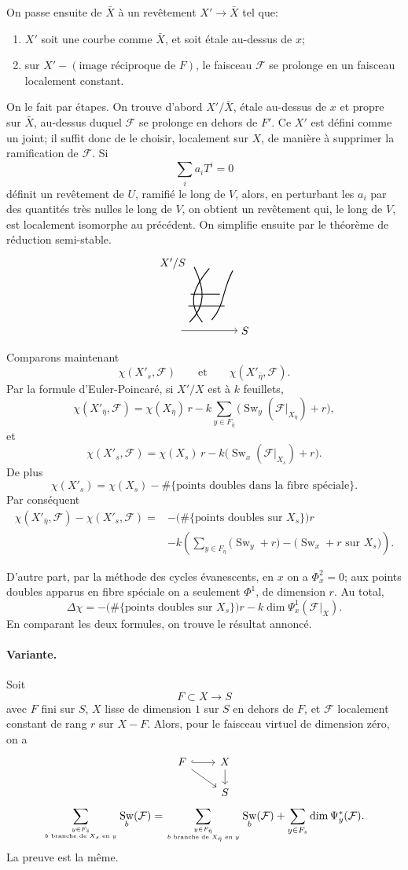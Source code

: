 \documentclass[11pt]{article}
\newcommand{\semistableCoverSketch}{%
\begin{tikzpicture}[scale=.75,baseline=-.5ex]
  \draw[->] (-.2,0) -- (2.2,0) node[right]{$S$};
  \draw[thick] (.15,.35) .. controls (.85,1.05) and (.82,1.75) .. (.35,2.7);
  \draw[thick] (.7,.35) .. controls (.15,1.05) and (.15,1.65) .. (1.0,2.65);
  \draw[thick] (1.1,.45) .. controls (1.65,1.05) and (1.55,1.75) .. (2.0,2.55);
  \draw[thick] (.1,1.05) -- (1.65,1.05);
  \draw[thick] (.2,1.55) -- (1.45,1.55);
  \node[left] at (.15,2.85){$X'/S$};
\end{tikzpicture}%
}
\newcommand{\F}{\mathcal F}
\DeclareMathOperator{\Sw}{Sw}
\begin{document}
On passe ensuite de \(\bar X\) à un revêtement \(X'\to\bar X\) tel que:
\begin{enumerate}[label=\alph*)]
\item \(X'\) soit une courbe comme \(\bar X\), et soit étale au-dessus de \(x\);
\item sur \(X'-(\text{image réciproque de }F)\), le faisceau \(\F\) se prolonge en un faisceau localement constant.
\end{enumerate}

On le fait par étapes. On trouve d'abord \(X'/\bar X\), étale au-dessus de \(x\) et propre sur \(\bar X\), au-dessus duquel \(\F\) se prolonge en dehors de \(F'\). Ce \(X'\) est défini comme un joint; il suffit donc de le choisir, localement sur \(X\), de manière à supprimer la ramification de \(\F\). Si
\[
  \sum_i a_i T^i=0
\]
définit un revêtement de \(U\), ramifié le long de \(V\), alors, en perturbant les \(a_i\) par des quantités très nulles le long de \(V\), on obtient un revêtement qui, le long de \(V\), est localement isomorphe au précédent. On simplifie ensuite par le théorème de réduction semi-stable.
\[
\semistableCoverSketch
\]

Comparons maintenant
\[
  \chi(X'_s,\F)\qquad\text{et}\qquad \chi(X'_{\bar\eta},\F).
\]
Par la formule d'Euler-Poincaré, si \(X'/X\) est à \(k\) feuillets,
\[
 \chi(X'_{\bar\eta},\F)
 =\chi(X_{\bar\eta})\,r
 -k\sum_{y\in F_{\bar\eta}}
   \bigl(\Sw_y(\F|_{X_{\bar\eta}})+r\bigr),
\]
et
\[
 \chi(X'_s,\F)
 =\chi(X_s)\,r
 -k\bigl(\Sw_x(\F|_{X_s})+r\bigr).
\]
De plus
\[
  \chi(X'_s)=\chi(X_s)-
  \#\{\text{points doubles dans la fibre spéciale}\}.
\]
Par conséquent
\[
\begin{aligned}
\chi(X'_{\bar\eta},\F)-\chi(X'_s,\F)
={}&-\bigl(\#\{\text{points doubles sur }X_s\}\bigr)r \\
&-k\left(
 \sum_{y\in F_{\bar\eta}}\bigl(\Sw_y+r\bigr)
 -\bigl(\Sw_x+r\text{ sur }X_s\bigr)
\right).
\end{aligned}
\]

D'autre part, par la méthode des cycles évanescents, en \(x\) on a \(\Phi_x^2=0\); aux points doubles apparus en fibre spéciale on a seulement \(\Phi^1\), de dimension \(r\). Au total,
\[
  \Delta\chi
  =-\bigl(\#\{\text{points doubles sur }X_s\}\bigr)r
   -k\dim \Psi_x^1(\F|_X).
\]
En comparant les deux formules, on trouve le résultat annoncé.

\paragraph{Variante.}
Soit
\[
  F\subset X\longrightarrow S
\]
avec \(F\) fini sur \(S\), \(X\) lisse de dimension \(1\) sur \(S\) en dehors de \(F\), et \(\F\) localement constant de rang \(r\) sur \(X-F\). Alors, pour le faisceau virtuel de dimension zéro, on a
\[
\begin{tikzcd}[column sep=2.2em,row sep=1.4em]
F \arrow[r, hook] \arrow[dr] & X \arrow[d] \\
& S
\end{tikzcd}
\]
\[
\sum_{y\in F_{\bar s}\atop b\text{ branche de }X_s\text{ en }y}
\Sw_b(\F)
=
\sum_{y\in F_{\bar\eta}\atop b\text{ branche de }X_{\bar\eta}\text{ en }y}
\Sw_b(\F)
+
\sum_{y\in F_s}\dim \Psi_y^*(\F).
\]
La preuve est la même.
\end{document}
